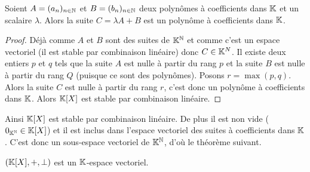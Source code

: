 \begin{lemme}
  Soient \(A = (a_n)_{n \in \mathbb{N}}\) et \(B = (b_n)_{n \in \mathbb{N}}\) deux polynômes à 
  coefficients dans \(\mathbb{K}\) et un scalaire \(\lambda\). Alors la suite 
  \(C = \lambda A+B\) est un polynôme à coefficients dans \(\mathbb{K}\).
\end{lemme}
\begin{proof}
Déjà comme \(A\) et \(B\) sont des suites de \(\mathbb{K}^{\mathbb{N}}\) et comme c'est un espace 
vectoriel (il est stable par combinaison linéaire) donc \(C \in \mathbb{K}^N\). Il 
existe deux entiers \(p\) et \(q\) tels que la suite \(A\) est nulle à partir du 
rang \(p\) et la suite \(B\) est nulle à partir du rang \(Q\) (puisque ce sont 
des polynômes). Posons \(r = \max(p,q)\). Alors la suite \(C\) est nulle à partir 
du rang \(r\), c'est donc un polynôme à coefficients dans \(\mathbb{K}\). Alors 
\(\mathbb{K}[X]\) est stable par combinaison linéaire. \end{proof}

Ainsi \(\mathbb{K}[X]\) est stable par combinaison linéaire. De plus il est non vide 
(\(0_{\mathbb{K}^{\mathbb{N}}} \in \mathbb{K}[X]\)) et il est inclus dans l'espace vectoriel des suites à 
coefficients dans \(\mathbb{K}\). C'est donc un sous-espace vectoriel de \(\mathbb{K}^{\mathbb{N}}\), d'où 
le théorème suivant.

\begin{theo}
  \((\mathbb{K}[X], +, \perp)\) est un \(\mathbb{K}\)-espace vectoriel.
\end{theo}


